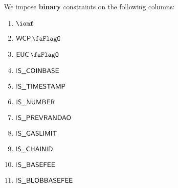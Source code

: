 We impose \textbf{binary} constraints on the following columns:
\begin{multicols}{4}
	\begin{enumerate}
		\item $\iomf$
		\item $\wcpFlag$
		\item $\eucFlag$
		\item $\textsf{IS\_COINBASE}$
		\item $\textsf{IS\_TIMESTAMP}$
		\item $\textsf{IS\_NUMBER}$
		\item $\textsf{IS\_PREVRANDAO}$
		\item $\textsf{IS\_GASLIMIT}$
		\item $\textsf{IS\_CHAINID}$
		\item $\textsf{IS\_BASEFEE}$
		\item $\textsf{IS\_BLOBBASEFEE}$
	\end{enumerate}
\end{multicols}
